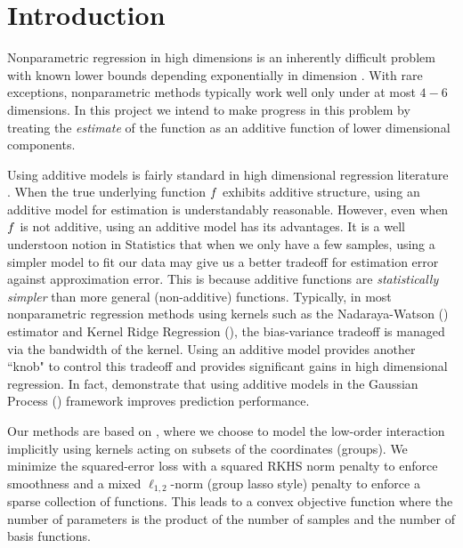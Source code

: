 

\section{Introduction}

Nonparametric regression in high dimensions is an inherently difficult problem with known
lower bounds depending exponentially in dimension
\citep{gyorfi02distributionfree}. 
With rare exceptions,
nonparametric methods typically work well only under at most $4-6$ dimensions.
In this project we intend to make progress in this problem by treating the
\emph{estimate} of the function as
an additive function of lower dimensional components.

Using additive models is fairly standard in high dimensional regression
literature
\cite{hastie90gam,ravikumar09spam,lafferty05rodeo}. 
When the true underlying function $f$ exhibits additive structure, using an additive
model for estimation is understandably reasonable. However, even when $f$ is
not additive, using an additive model has its advantages. 
It is a well understoon notion in Statistics that when we only have a few samples, using a
simpler model to fit our data may give us a better tradeoff for estimation error  
against approximation error. 
This is because additive functions are \emph{statistically simpler}
than more general (non-additive) functions.
Typically, in most nonparametric regression methods using kernels such as the
Nadaraya-Watson
(\nw) estimator and Kernel Ridge Regression (\krr), the bias-variance tradeoff
is managed via the bandwidth of the kernel. 
Using an additive model
provides another ``knob" to control this tradeoff and provides significant gains
in high dimensional regression. In fact, \citet{duvenaud11additivegps}
demonstrate that using additive models in the Gaussian Process (\gp) framework
improves prediction performance.

Our methods are based on \krr, where
we choose to model the low-order interaction implicitly using kernels acting on
subsets of the coordinates (groups).
We minimize the squared-error loss with 
a squared RKHS norm penalty to enforce smoothness
and a mixed $\ell_{1,2}$-norm (group lasso style) penalty 
to enforce a sparse collection of functions.
This leads to a convex objective function where the number of parameters is
the product of the number of samples and the number of basis functions.


